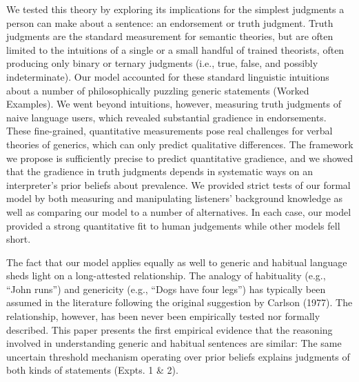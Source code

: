 \documentclass[english,,man,floatsintext]{apa6}
\theoremstyle{definition}
\theoremstyle{definition}
\theoremstyle{definition}
\theoremstyle{remark}
\begin{document}
We tested this theory by exploring its implications for the simplest
judgments a person can make about a sentence: an endorsement or truth
judgment. Truth judgments are the standard measurement for semantic
theories, but are often limited to the intuitions of a single or a small
handful of trained theorists, often producing only binary or ternary
judgments (i.e., true, false, and possibly indeterminate). Our model
accounted for these standard linguistic intuitions about a number of
philosophically puzzling generic statements (Worked Examples). We went
beyond intuitions, however, measuring truth judgments of naive language
users, which revealed substantial gradience in endorsements. These
fine-grained, quantitative measurements pose real challenges for verbal
theories of generics, which can only predict qualitative differences.
The framework we propose is sufficiently precise to predict quantitative
gradience, and we showed that the gradience in truth judgments depends
in systematic ways on an interpreter's prior beliefs about prevalence.
We provided strict tests of our formal model by both measuring and
manipulating listeners' background knowledge as well as comparing our
model to a number of alternatives. In each case, our model provided a
strong quantitative fit to human judgements while other models fell
short.

The fact that our model applies equally as well to generic and habitual
language sheds light on a long-attested relationship. The analogy of
habituality (e.g., \enquote{John runs}) and genericity (e.g.,
\enquote{Dogs have four legs}) has typically been assumed in the
literature following the original suggestion by Carlson (1977). The
relationship, however, has been never been empirically tested nor
formally described. This paper presents the first empirical evidence
that the reasoning involved in understanding generic and habitual
sentences are similar: The same uncertain threshold mechanism operating
over prior beliefs explains judgments of both kinds of statements
(Expts. 1 \& 2).
\end{document}
